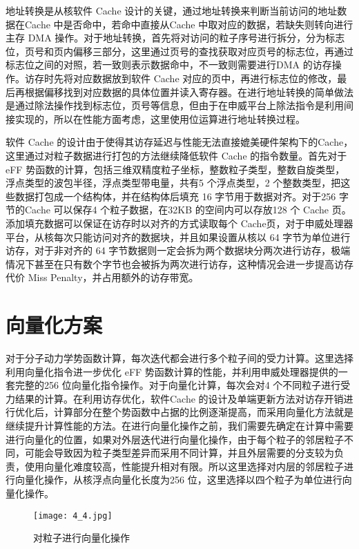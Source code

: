 地址转换是从核软件 Cache 设计的关键，通过地址转换来判断当前访问的地址数据在Cache 中是否命中，若命中直接从Cache 中取对应的数据，若缺失则转向进行主存 DMA 操作。对于地址转换，首先将对访问的粒子序号进行拆分，分为标志位，页号和页内偏移三部分，这里通过页号的查找获取对应页号的标志位，再通过标志位之间的对照，若一致则表示数据命中，不一致则需要进行DMA 的访存操作。访存时先将对应数据放到软件 Cache 对应的页中，再进行标志位的修改，最后再根据偏移找到对应数据的具体位置并读入寄存器。在进行地址转换的简单做法是通过除法操作找到标志位，页号等信息，但由于在申威平台上除法指令是利用间接实现的，所以在性能方面考虑，这里使用位运算进行地址转换过程。

软件 Cache 的设计由于使得其访存延迟与性能无法直接媲美硬件架构下的Cache，这里通过对粒子数据进行打包的方法继续降低软件 Cache 的指令数量。首先对于 eFF 势函数的计算，包括三维双精度粒子坐标，整数粒子类型，整数自旋类型，浮点类型的波包半径，浮点类型带电量，共有5 个浮点类型，2 个整数类型，把这些数据打包成一个结构体，并在结构体后填充 16 字节用于数据对齐。对于256 字节的Cache 可以保存4 个粒子数据，在32KB 的空间内可以存放128 个 Cache 页。添加填充数据可以保证在访存时以对齐的方式读取每个 Cache页，对于申威处理器平台，从核每次只能访问对齐的数据块，并且如果设置从核以 64 字节为单位进行访存，对于非对齐的 64 字节数据则一定会拆为两个数据块分两次进行访存，极端情况下甚至在只有数个字节也会被拆为两次进行访存，这种情况会进一步提高访存代价 Miss Penalty，并占用额外的访存带宽。

\section{向量化方案}
对于分子动力学势函数计算，每次迭代都会进行多个粒子间的受力计算。这里选择利用向量化指令进一步优化 eFF 势函数计算的性能，并利用申威处理器提供的一套完整的256 位向量化指令操作。对于向量化计算，每次会对4 个不同粒子进行受力结果的计算。在利用访存优化，软件Cache 的设计及单端更新方法对访存开销进行优化后，计算部分在整个势函数中占据的比例逐渐提高，而采用向量化方法就是继续提升计算性能的方法。在进行向量化操作之前，我们需要先确定在计算中需要进行向量化的位置，如果对外层迭代进行向量化操作，由于每个粒子的邻居粒子不同，可能会导致因为粒子类型差异而采用不同计算，并且外层需要的分支较为负责，使用向量化难度较高，性能提升相对有限。所以这里选择对内层的邻居粒子进行向量化操作，从核浮点向量化长度为256 位，这里选择以四个粒子为单位进行向量化操作。

 \begin{figure}[h]
  \centering
  \texttt{[image: 4\_4.jpg]}
  \caption{对粒子进行向量化操作}
  \label{fig:badge}
\end{figure}

